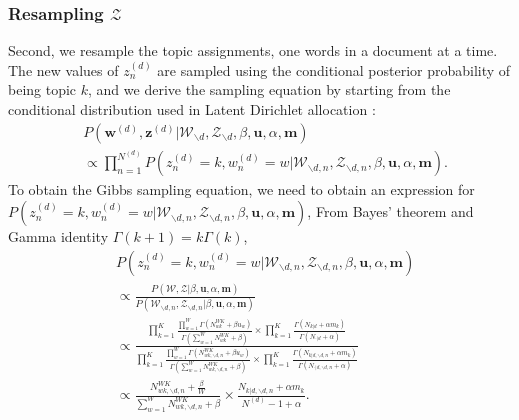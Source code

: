 \documentclass[a4paper]{article}
\begin{document}
   \subsubsection{Resampling $\mathcal{Z}$}  \label{subsec: Resampling Z}
   Second, we resample the topic assignments, one words in a document at a time.  The new values of $z^{(d)}_n$ are sampled using the conditional posterior probability of being topic $k$, and we derive the sampling equation by starting from the conditional distribution used in Latent Dirichlet allocation \citep{Blei2003}:
     \begin{equation}
     \begin{aligned}
     & P(\boldsymbol{w}^{(d)}, \boldsymbol{z}^{(d)}|\mathcal{W}_{\backslash d}, \mathcal{Z}_{\backslash d}, \beta, \boldsymbol{u}, \alpha, \boldsymbol{m}) \\& \propto \prod_{n=1}^{N^{(d)}}P(z^{(d)}_n=k, w^{(d)}_n=w| \mathcal{W}_{\backslash d, n}, \mathcal{Z}_{\backslash d, n}, \beta, \boldsymbol{u}, \alpha, \boldsymbol{m}).
     \end{aligned}
     \end{equation} 
     To obtain the Gibbs sampling equation, we need to obtain an expression for $P(z^{(d)}_n=k,  w^{(d)}_n=w|\mathcal{W}_{\backslash d, n}, \mathcal{Z}_{\backslash d, n}, \beta, \boldsymbol{u}, \alpha, \boldsymbol{m})$,
     From Bayes' theorem and Gamma identity $\Gamma(k+1)=k\Gamma(k)$,
     \begin{equation}
     \begin{aligned}
     & P(z^{(d)}_n=k, w^{(d)}_n=w|\mathcal{W}_{\backslash d, n}, \mathcal{Z}_{\backslash d, n}, \beta, \boldsymbol{u}, \alpha, \boldsymbol{m}) \\& \propto 
     \frac{P(\mathcal{W}, \mathcal{Z}|\beta, \boldsymbol{u}, \alpha, \boldsymbol{m})}{P(\mathcal{W}_{\backslash d, n}, \mathcal{Z}_{\backslash d, n}|\beta, \boldsymbol{u}, \alpha, \boldsymbol{m})}\\& \propto \frac{\prod_{k=1}^{K}\frac{\prod_{w=1}^W\Gamma(N_{wk}^{WK}+\beta u_w)}{\Gamma(\sum_{w=1}^WN_{wk}^{WK}+\beta )}\times\prod_{k=1}^K\frac{\Gamma(N_{k|d}+\alpha m_k)}{\Gamma(N_{\cdot|d}+\alpha)}}{\prod_{k=1}^{K}\frac{\prod_{w=1}^W\Gamma(N_{wk, \backslash d, n}^{WK}+\beta u_w)}{\Gamma(\sum_{w=1}^WN_{wk, \backslash d, n}^{WK}+\beta )}\times\prod_{k=1}^K\frac{\Gamma(N_{k|d, \backslash d, n}+\alpha m_k)}{\Gamma(N_{\cdot|d, \backslash d, n}+\alpha)}}\\ & \propto 
     \frac{N_{wk, \backslash d, n}^{WK}+\frac{\beta}{W}}{\sum_{w=1}^WN_{wk,  \backslash d, n}^{WK}+\beta}\times\frac{N_{k|d, \backslash d, n}+\alpha m_k}{N^{(d)}-1+\alpha}.
     \end{aligned}
     \end{equation}
\end{document}
